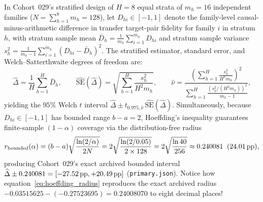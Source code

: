 In Cohort~029's stratified design of $H=8$ equal strata of $m_h = 16$ independent families ($N = \sum_{h=1}^8 m_h = 128$), let $D_{hi} \in [-1, 1]$ denote the family-level causal-minus-arithmetic difference in transfer target-pair fidelity for family $i$ in stratum $h$, with stratum sample mean $\bar{D}_h = \frac{1}{m_h}\sum_{i=1}^{m_h} D_{hi}$ and stratum sample variance $s_h^2 = \frac{1}{m_h-1}\sum_{i=1}^{m_h}(D_{hi}-\bar{D}_h)^2$. The stratified estimator, standard error, and Welch--Satterthwaite degrees of freedom \citep{welch1947generalization} are:
\begin{equation}
  \widehat{\Delta} = \frac{1}{H}\sum_{h=1}^H \bar{D}_h, \qquad
  \widehat{\mathrm{SE}}(\widehat{\Delta}) = \sqrt{\sum_{h=1}^H \frac{s_h^2}{H^2 m_h}}, \qquad
  \hat{\nu} = \frac{\left(\sum_{h=1}^H \frac{s_h^2}{H^2 m_h}\right)^2}{\sum_{h=1}^H \frac{(s_h^2 / (H^2 m_h))^2}{m_h - 1}},
  \label{eq:strat_welch}
\end{equation}
yielding the $95\%$ Welch $t$ interval $\widehat{\Delta} \pm t_{0.975, \hat{\nu}}\,\widehat{\mathrm{SE}}(\widehat{\Delta})$. Simultaneously, because $D_{hi} \in [-1, 1]$ has bounded range $b - a = 2$, Hoeffding's inequality \citep{hoeffding1963probability} guarantees finite-sample $(1-\alpha)$ coverage via the distribution-free radius
\begin{equation}
  r_{\mathrm{bounded}}(\alpha) = (b - a)\sqrt{\frac{\ln(2/\alpha)}{2 N}} = 2\sqrt{\frac{\ln(2/0.05)}{2 \times 128}} = 2\sqrt{\frac{\ln 40}{256}} \approx 0.240081 \;\;(24.01\,\mathrm{pp}),
  \label{eq:hoeffding_radius}
\end{equation}
producing Cohort~029's exact archived bounded interval $\widehat{\Delta} \pm 0.240081 = [-27.52\,\mathrm{pp}, +20.49\,\mathrm{pp}]$ (\texttt{primary.json}). Notice how equation~\eqref{eq:hoeffding_radius} reproduces the exact archived radius $-0.03515625 - (-0.27523695) = 0.24008070$ to eight decimal places!
